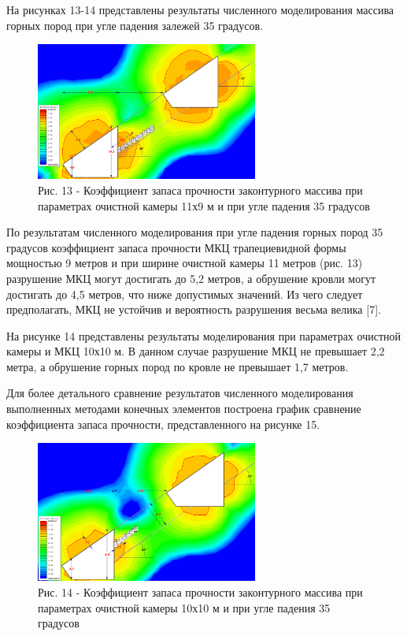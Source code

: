 На рисунках 13-14 представлены результаты численного моделирования
массива горных пород при угле падения залежей 35 градусов.

\begin{figure}[H]
	\centering
	\includegraphics[width=0.65\textwidth]{assets/293}
	\caption*{Рис. 13 - Коэффициент запаса прочности законтурного массива при
параметрах очистной камеры 11х9 м и при угле падения 35 градусов}
\end{figure}

\begin{multicols}{2}
По результатам численного моделирования при угле падения горных пород 35
градусов коэффициент запаса прочности МКЦ трапециевидной формы мощностью
9 метров и при ширине очистной камеры 11 метров (рис. 13) разрушение МКЦ
могут достигать до 5,2 метров, а обрушение кровли могут достигать до 4,5
метров, что ниже допустимых значений. Из чего следует предполагать, МКЦ
не устойчив и вероятность разрушения весьма велика {[}7{]}.

На рисунке 14 представлены результаты моделирования при параметрах
очистной камеры и МКЦ 10х10 м. В данном случае разрушение МКЦ не
превышает 2,2 метра, а обрушение горных пород по кровле не превышает 1,7
метров.

Для более детального сравнение результатов численного моделирования
выполненных методами конечных элементов построена график сравнение
коэффициента запаса прочности, представленного на рисунке 15.
\end{multicols}

\begin{figure}[H]
	\centering
	\includegraphics[width=0.65\textwidth]{assets/294}
	\caption*{Рис. 14 - Коэффициент запаса прочности законтурного массива при
параметрах очистной камеры 10х10 м и при угле падения 35 градусов}
\end{figure}

